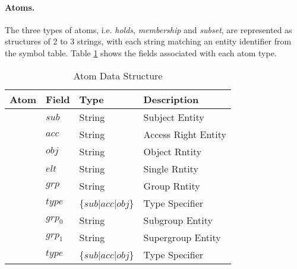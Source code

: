 \documentclass[11pt]{report}
\begin{document}
          \paragraph{Atoms.}

            The three types of atoms, i.e. {\em holds}, {\em membership}
            and {\em subset}, are represented as structures of 2 to 3
            strings, with each string matching an entity identifier from
            the symbol table. Table \ref{tabl-polup-atdsr} shows the
            fields associated with each atom type.

            \begin{table}[tbhp]
              \begin{center}
                \begin{tabular}[t]{|l|l|l|l|}
                  \hline
                  \textbf{Atom}             & \textbf{Field} & \textbf{Type}             & \textbf{Description} \\
                  \hline
                  {\multirow{3}{*}{holds}}  & $sub$          & String                    & Subject Entity \\
                  \cline{2-4}
                                            & $acc$          & String                    & Access Right Entity \\
                  \cline{2-4}
                                            & $obj$          & String                    & Object Rntity \\
                  \hline
                  {\multirow{3}{*}{member}} & $elt$          & String                    & Single Rntity \\
                  \cline{2-4}
                                            & $grp$          & String                    & Group Rntity \\
                  \cline{2-4}
                                            & $type$         & \{$sub$$|$$acc$$|$$obj$\} & Type Specifier \\
                  \hline
                  {\multirow{3}{*}{subset}} & $grp_0$        & String                    & Subgroup Entity \\
                  \cline{2-4}
                                            & $grp_1$        & String                    & Supergroup Entity \\
                  \cline{2-4}
                                            & $type$         & \{$sub$$|$$acc$$|$$obj$\} & Type Specifier \\
                  \hline
                \end{tabular}
              \end{center}
              \caption{Atom Data Structure}
              \label{tabl-polup-atdsr}
            \end{table}
\end{document}
